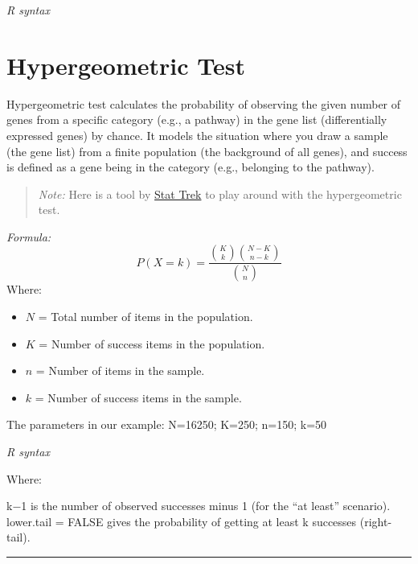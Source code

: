 \documentclass[
]{book}
\begin{document}
\emph{R syntax}

\hypertarget{hypergeometric-test}{%
\section{\texorpdfstring{{Hypergeometric Test}}{Hypergeometric Test}}\label{hypergeometric-test}}

Hypergeometric test calculates the probability of observing the given number of genes from a specific category (e.g., a pathway) in the gene list (differentially expressed genes) by chance. It models the situation where you draw a sample (the gene list) from a finite population (the background of all genes), and success is defined as a gene being in the category (e.g., belonging to the pathway).

\begin{quote}
\emph{Note:} Here is a tool by \href{https://stattrek.com/online-calculator/hypergeometric}{Stat Trek} to play around with the hypergeometric test.
\end{quote}

\emph{Formula:}
\[P(X = k) = \frac{\binom{K}{k} \binom{N - K}{n - k}}{\binom{N}{n}}\]
Where:

\begin{itemize}
\item
  \(N\) = Total number of items in the population.
\item
  \(K\) = Number of success items in the population.
\item
  \(n\) = Number of items in the sample.
\item
  \(k\) = Number of success items in the sample.
\end{itemize}

The parameters in our example:
N=16250; K=250; n=150; k=50

\emph{R syntax}

Where:

k−1 is the number of observed successes minus 1 (for the ``at least'' scenario).
lower.tail = FALSE gives the probability of getting at least k successes (right-tail).

\begin{center}\rule{0.5\linewidth}{0.5pt}\end{center}

\hypertarget{section}{%
\subsubsection*{}\label{section}}
\end{document}
